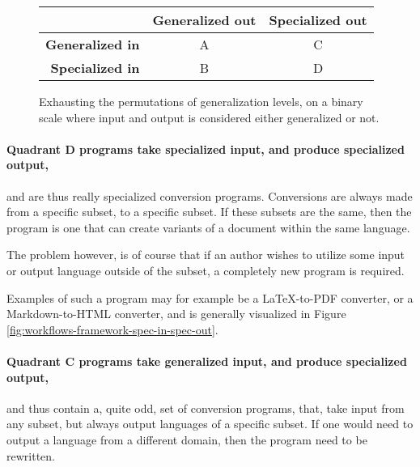 \documentclass{scrreprt}
\begin{document}
\begin{figure}[h]
  \centering

  \def\arraystretch{1.5}
  \begin{tabular}{r|c|c}

    & \textbf{Generalized out} & \textbf{Specialized out} \\ \hline

    \textbf{Generalized in} &
     A
    &
     C

    \\ \hline

    \textbf{Specialized in} &
     B
    &
     D

    \\ 
  \end{tabular}

  \caption{Exhausting the permutations of generalization levels, on a binary scale where input and output is considered either generalized or not.}
  \label{fig:microframework-quadrant}
\end{figure}




\paragraph{Quadrant D programs take specialized input, and produce specialized output,}
and are thus really specialized conversion programs. Conversions are always made from a specific subset, to a specific subset. If these subsets are the same, then the program is one that can create variants of a document within the same language.

The problem however, is of course that if an author wishes to utilize some input or output language outside of the subset, a completely new program is required.

Examples of such a program may for example be a \LaTeX{}-to-PDF converter, or a Markdown-to-HTML converter, and is generally visualized in Figure \ref{fig:workflows-framework-spec-in-spec-out}.


\paragraph{Quadrant C programs take generalized input, and produce specialized output,} and thus contain a, quite odd, set of conversion programs, that, take input from any subset, but always output languages of a specific subset. If one would need to output a language from a different domain, then the program need to be rewritten.
\end{document}
